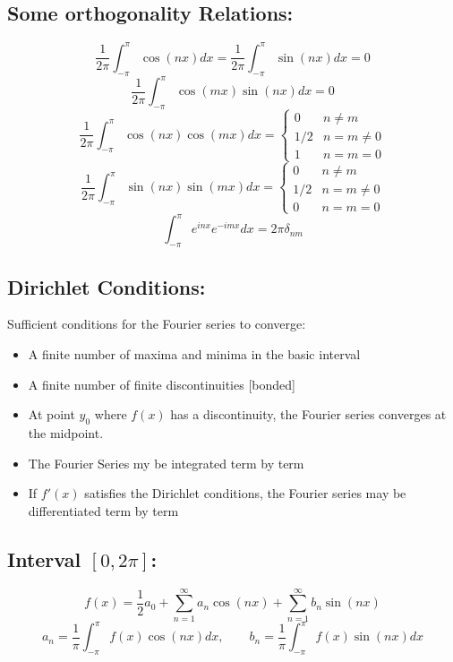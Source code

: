 \documentclass[a4paper,norsk, 10pt]{article}
\begin{document}
\subsection{Some orthogonality Relations:}
\begin{equation}
\frac{1}{2\pi}\int_{-\pi}^{\pi}\cos(nx)dx = \frac{1}{2\pi}\int_{-\pi}^{\pi}\sin(nx)dx = 0
\end{equation}
\begin{equation}
\frac{1}{2\pi}\int_{-\pi}^{\pi}\cos(mx)\sin(nx)dx = 0
\end{equation}
\begin{equation}
\frac{1}{2\pi}\int_{-\pi}^{\pi}\cos(nx)\cos(mx)dx
=\begin{cases}
0 & n\neq m\\
1/2 & n = m \neq 0\\
1 & n=m=0
\end{cases}
\end{equation}
\begin{equation}
\frac{1}{2\pi}\int_{-\pi}^{\pi}\sin(nx)\sin(mx)dx
=\begin{cases}
0 & n\neq m\\
1/2 & n = m \neq 0\\
0 & n=m=0
\end{cases}
\end{equation}
\begin{equation}
\int_{-\pi}^{\pi}e^{inx}e^{-imx}dx = 2\pi\delta_{nm}
\end{equation}

\subsection{Dirichlet Conditions:}
Sufficient conditions for the Fourier series to converge:
\begin{itemize}
\item A finite number of maxima and minima in the basic interval
\item A finite number of finite discontinuities [bonded]
\item At point $y_0$ where $f(x)$ has a discontinuity, the Fourier series converges at the midpoint.
\item The Fourier Series my be integrated term by term
\item If $f'(x)$ satisfies the Dirichlet conditions, the Fourier series may be differentiated term by term
\end{itemize}


\subsection{Interval $[0,2\pi]$:}
\begin{equation}
f(x) = \frac{1}{2}a_0 + \sum_{n=1}^{\infty}a_n\cos(nx) + \sum_{n=1}^{\infty}b_n\sin(nx) 
\end{equation}
\begin{equation}
a_n = \frac{1}{\pi}\int_{-\pi}^{\pi}f(x)\cos(nx)dx, \qquad b_n = \frac{1}{\pi}\int_{-\pi}^{\pi}f(x)\sin(nx)dx
\end{equation}
\end{document}
